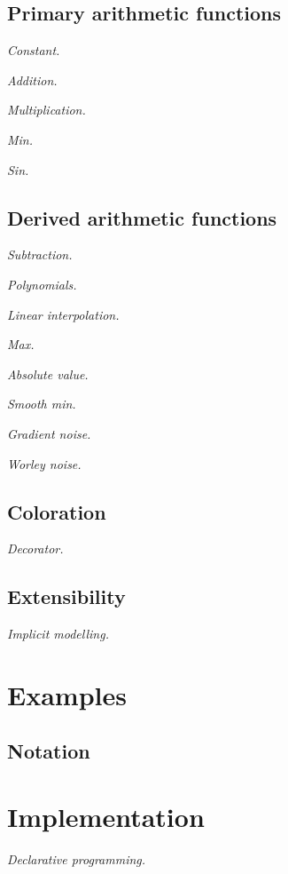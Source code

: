 \documentclass[twocolumn,twoside]{Jornadas}
\begin{document}
\subsection{Primary arithmetic functions}

\textit{Constant.}

\textit{Addition.}

\textit{Multiplication.}

\textit{Min.}

\textit{Sin.}

\subsection{Derived arithmetic functions}

\textit{Subtraction.}

\textit{Polynomials.}

\textit{Linear interpolation.}

\textit{Max.}

\textit{Absolute value.}

\textit{Smooth min.}

\textit{Gradient noise.}

\textit{Worley noise.}

\subsection{Coloration}

\textit{Decorator.}

\subsection{Extensibility}

\textit{Implicit modelling.}

\section{Examples}

\subsection{Notation}

\section{Implementation}

\textit{Declarative programming.}
\end{document}
